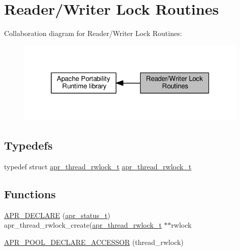 \hypertarget{group__apr__thread__rwlock}{}\section{Reader/\+Writer Lock Routines}
\label{group__apr__thread__rwlock}
Collaboration diagram for Reader/\+Writer Lock Routines\+:
\nopagebreak
\begin{figure}[H]
\begin{center}
\leavevmode
\includegraphics[width=313pt]{group__apr__thread__rwlock}
\end{center}
\end{figure}
\subsection*{Typedefs}
\begin{DoxyCompactItemize}
\item 
typedef struct \hyperlink{structapr__thread__rwlock__t}{apr\+\_\+thread\+\_\+rwlock\+\_\+t} \hyperlink{group__apr__thread__rwlock_gaede9b908e3d9e6a8aed7bd10d0ae0498}{apr\+\_\+thread\+\_\+rwlock\+\_\+t}
\end{DoxyCompactItemize}
\subsection*{Functions}
\begin{DoxyCompactItemize}
\item 
\hyperlink{group__apr__thread__rwlock_ga788cd55d3e3936d9dc876b3425fe20a6}{A\+P\+R\+\_\+\+D\+E\+C\+L\+A\+RE} (\hyperlink{group__apr__errno_gaa5105fa83cc322f09382292db8b47593}{apr\+\_\+status\+\_\+t}) apr\+\_\+thread\+\_\+rwlock\+\_\+create(\hyperlink{structapr__thread__rwlock__t}{apr\+\_\+thread\+\_\+rwlock\+\_\+t} $\ast$$\ast$rwlock
\item 
\hyperlink{group__apr__thread__rwlock_ga4e4f18c32ba07b99ab8ab28cb5ba2df4}{A\+P\+R\+\_\+\+P\+O\+O\+L\+\_\+\+D\+E\+C\+L\+A\+R\+E\+\_\+\+A\+C\+C\+E\+S\+S\+OR} (thread\+\_\+rwlock)
\end{DoxyCompactItemize}
